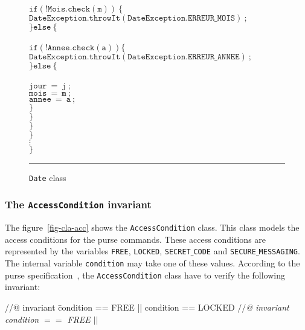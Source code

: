 \begin{center}
\begin{figure}[hbt]
\begin{tabbing}
\>\> \\
\>\>\>$\mathtt{if(!Mois.check(m))\ \{}$\\
\>\>\>\>$\mathtt{DateException.throwIt(DateException.ERREUR\_MOIS)\ ;}$ \\
\>\>\>$\mathtt{\}else\ \{}$ \\
\>\>\> \\
\>\>\>\>$\mathtt{if(!Annee.check(a)) \{}$ \\
\>\>\>\>\>$\mathtt{DateException.throwIt(DateException.ERREUR\_ANNEE)\ ;}$ \\
\>\>\>\>$\mathtt{\}else\ \{}$ \\
\>\>\>\> \\
\>\>\>\>\>$\mathtt{jour\ =\ j\ ;} $\\
\>\>\>\>\>$\mathtt{mois\ =\ m\ ;} $\\
\>\>\>\>\>$\mathtt{annee\ =\ a\ ;} $\\
\>\>\>\>$\mathtt{\}}$ \\
\>\>\>$\mathtt{\}} $\\
\>\>$\mathtt{\}} $\\
\>$\mathtt{\}} $\\
\>$\vdots$ \\
$\mathtt{\}}$ \\
\end{tabbing}
\caption{{\tt Date} class}
\label{fig-cla-dat}
\rule{\linewidth}{0.3mm}
\end{figure}
\end{center}


\subsubsection{The {\tt \bf AccessCondition} invariant}
The figure~\ref{fig-cla-acc} shows the \texttt{AccessCondition}
class. This class models the access conditions for the purse
commands. These access conditions are represented by the variables
\texttt{FREE}, \texttt{LOCKED}, \texttt{SECRET$\_$CODE} and
\texttt{SECURE$\_$MESSAGING}. The internal variable \texttt{condition} 
may take one of these values. According to the purse
specification~\cite{BMGL00}, the \texttt{AccessCondition} class have
to verify the following invariant$:$ \\

\begin{tabbing}
//@ invariant \=condition == FREE || condition == LOCKED \kill
{\it $\slash\slash$@ invariant condition $==$ FREE $||$} \\
 \\
 \\
 \\
 \\
\end{tabbing}

